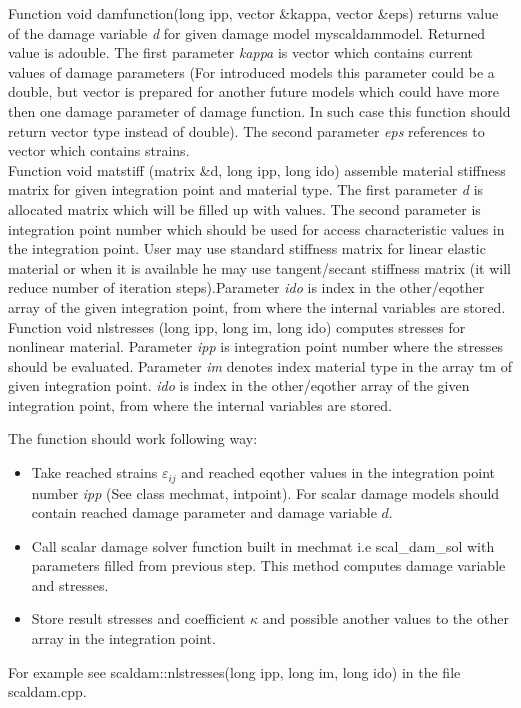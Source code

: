 Function {\sf void damfunction(long ipp, vector  \&kappa, vector \&eps)} returns value of the damage
variable {\it d} for given damage model {\sf myscaldammodel}. Returned value is a{\sf double}.
The first parameter {\it kappa} is vector which contains current values of damage parameters (For
introduced models this parameter could be a {\sf double}, but {\sf vector} is prepared for another
future models which could have more then one damage parameter of damage function. In such case this
function should return {\sf vector} type instead of {\sf double}). The second parameter {\it eps}
references to vector which contains strains.\\

Function {\sf void matstiff (matrix  \&d, long ipp, long ido)} assemble material stiffness matrix for given
integration point and material type. The first parameter {\it d} is allocated matrix which will be
filled up with values. The second parameter is integration point number which should be used for
access characteristic values in the integration point. User may use standard stiffness matrix for
linear elastic material or when it is available he may use tangent/secant stiffness matrix (it will reduce
number of iteration steps).Parameter {\it ido} is index in the {\sf other/eqother} array of the given integration 
point, from where the internal variables are stored.
\\

Function {\sf void nlstresses (long ipp, long im, long ido)} computes stresses for nonlinear material. Parameter
{\it ipp} is integration point number where the stresses should be evaluated. Parameter {\it im} denotes
index material type in the array {\sf tm} of given integration point. {\it ido} is index in the
{\sf other/eqother} array of the given integration point, from where the internal variables are stored.

The function should work following way:
\begin{itemize}
\item
Take reached strains $\varepsilon_{ij}$ and reached {\sf eqother} values in the integration point number
{\it ipp} (See class {\sf mechmat, intpoint}). For scalar damage models should contain reached damage
parameter and damage variable  $d$.
\item
Call scalar damage solver function built in {\sf mechmat} i.e {\sf scal\_dam\_sol} with parameters filled
from previous step. This method computes damage variable and stresses.
\item
Store result stresses and coefficient $\kappa$ and possible another values to the {\sf other}
array in the integration point.
\end{itemize}
For example see {\sf scaldam::nlstresses(long ipp, long im, long ido)} in the file scaldam.cpp.\\

